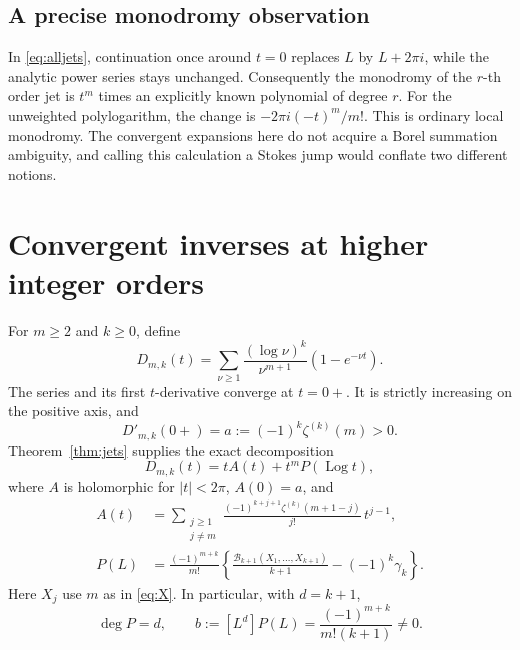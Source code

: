 \documentclass[11pt,a4paper]{article}
\numberwithin{equation}{section}
\theoremstyle{definition}
\theoremstyle{remark}
\DeclareMathOperator{\Log}{Log}
\begin{document}
\subsection{A precise monodromy observation}

In \eqref{eq:alljets}, continuation once around \(t=0\) replaces
\(L\) by \(L+2\pi i\), while the analytic power series stays unchanged.
Consequently the monodromy of the \(r\)-th order jet is \(t^m\) times
an explicitly known polynomial of degree \(r\).
For the unweighted polylogarithm, the change is
\(-2\pi i(-t)^m/m!\).
This is ordinary local monodromy.  The convergent expansions here do
not acquire a Borel summation ambiguity, and calling this calculation
a Stokes jump would conflate two different notions.

\section{Convergent inverses at higher integer orders}
\label{sec:weighted}

For \(m\ge2\) and \(k\ge0\), define
\begin{equation}
 D_{m,k}(t)=
 \sum_{\nu\ge1}\frac{(\log\nu)^k}{\nu^{m+1}}(1-e^{-\nu t}).
 \label{eq:Dmk}
\end{equation}
The series and its first \(t\)-derivative converge at \(t=0+\).
It is strictly increasing on the positive axis, and
\begin{equation}
 D'_{m,k}(0+)=a:=(-1)^k\zeta^{(k)}(m)>0.
 \label{eq:a}
\end{equation}
Theorem~\ref{thm:jets} supplies the exact decomposition
\begin{equation}
 D_{m,k}(t)=tA(t)+t^mP(\Log t),
 \label{eq:weighted-normal}
\end{equation}
where \(A\) is holomorphic for \(|t|<2\pi\), \(A(0)=a\), and
\begin{align}
 A(t)&=\sum_{\substack{j\ge1\\j\ne m}}
 \frac{(-1)^{k+j+1}\zeta^{(k)}(m+1-j)}{j!}\,t^{j-1},
 \label{eq:A}\\
 P(L)&=\frac{(-1)^{m+k}}{m!}
 \left\{\frac{\mathcal B_{k+1}(X_1,\ldots,X_{k+1})}{k+1}
                 -(-1)^k\gamma_k\right\}.
 \label{eq:P}
\end{align}
Here \(X_j\) use \(m\) as in \eqref{eq:X}.  In particular, with \(d=k+1\),
\begin{equation}
 \deg P=d,\qquad b:=[L^d]P(L)=\frac{(-1)^{m+k}}{m!(k+1)}\ne0.
 \label{eq:b}
\end{equation}
\end{document}
